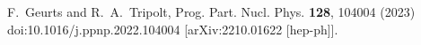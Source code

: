 F.~Geurts and R.~A.~Tripolt,
Prog. Part. Nucl. Phys. \textbf{128}, 104004 (2023)
doi:10.1016/j.ppnp.2022.104004
[arXiv:2210.01622 [hep-ph]].
